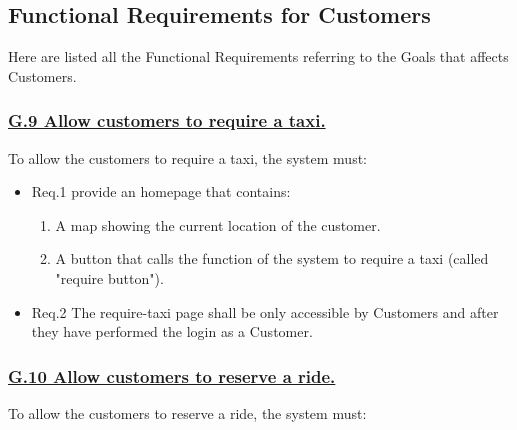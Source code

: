 		\subsection{Functional Requirements for Customers}
		Here are listed all the Functional Requirements referring to the Goals that affects Customers.

			\subsubsection{\lbrack \hyperref[sec:g9]{G.9 Allow customers to require a taxi.}\rbrack}\label{sec:frs9}
			To allow the customers to require a taxi, the system must:

				\begin{itemize}
					\item \lbrack Req.1\rbrack \label{sec:fr1_g9} provide an homepage that contains:
						\begin{enumerate}
							\item A map showing the current location of the customer.
							\item A button that calls the function of the system to require a taxi (called "require button").
						\end{enumerate}
					\item \lbrack Req.2\rbrack \label{sec:fr2_g9} The require-taxi page shall be only accessible by Customers and after they have performed the login as a Customer.
				\end{itemize}

			\subsubsection{\lbrack \hyperref[sec:g10]{G.10 Allow customers to reserve a ride.}\rbrack}\label{sec:frs10}
			To allow the customers to reserve a ride, the system must:

